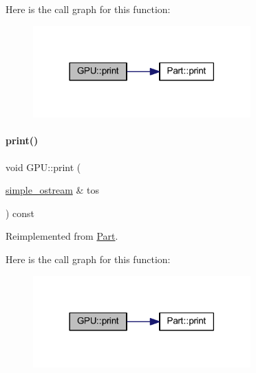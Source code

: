Here is the call graph for this function\+:
\nopagebreak
\begin{figure}[H]
\begin{center}
\leavevmode
\includegraphics[width=237pt]{class_g_p_u_acfa9ab35cdf1c25c324fc39c6ffc2412_cgraph}
\end{center}
\end{figure}
\mbox{\label{class_g_p_u_a27cb964d5ce05efa75cb65d836b922e1}} 
\paragraph{\texorpdfstring{print()}{print()}\hspace{0.1cm}{\footnotesize\ttfamily [3/4]}}
{\footnotesize\ttfamily void G\+P\+U\+::print (\begin{DoxyParamCaption}\item[{\mbox{\hyperlink{structsimple__ostream}{simple\+\_\+ostream}} \&}]{tos }\end{DoxyParamCaption}) const\hspace{0.3cm}{\ttfamily [virtual]}}



Reimplemented from \mbox{\hyperlink{class_part_aa602d876151b63db72cf8f666847a8cd}{Part}}.

Here is the call graph for this function\+:
\nopagebreak
\begin{figure}[H]
\begin{center}
\leavevmode
\includegraphics[width=237pt]{class_g_p_u_a27cb964d5ce05efa75cb65d836b922e1_cgraph}
\end{center}
\end{figure}
\mbox{\label{class_g_p_u_ad54f6d21007e216f27dc738aea2de836}} 
